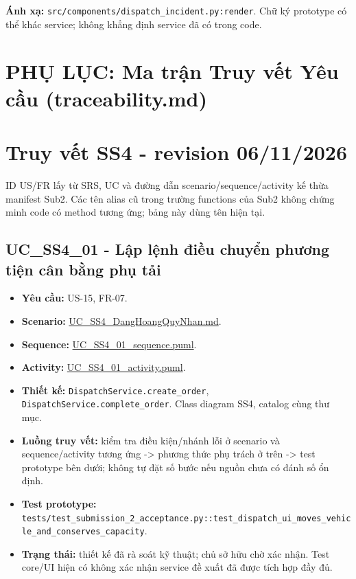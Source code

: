 \documentclass[11pt,a4paper]{article}
\providecommand{\tightlist}{%
  \setlength{\itemsep}{0pt}\setlength{\parskip}{0pt}}
\begin{document}
\textbf{Ánh xạ:} \texttt{src/components/dispatch\_incident.py:render}.
Chữ ký prototype có thể khác service; không khẳng định service đã có
trong code.

\newpage
\section*{PHỤ LỤC: Ma trận Truy vết Yêu cầu (traceability.md)}
\hypertarget{truy-vux1ebft-ss4---revision-06112026}{%
\section{Truy vết SS4 - revision
06/11/2026}\label{truy-vux1ebft-ss4---revision-06112026}}

ID US/FR lấy từ SRS, UC và đường dẫn scenario/sequence/activity kế thừa
manifest Sub2. Các tên alias cũ trong trường functions của Sub2 không
chứng minh code có method tương ứng; bảng này dùng tên hiện tại.

\hypertarget{uc_ss4_01---lux1eadp-lux1ec7nh-ux111iux1ec1u-chuyux1ec3n-phux1b0ux1a1ng-tiux1ec7n-cuxe2n-bux1eb1ng-phux1ee5-tux1ea3i}{%
\subsection{UC\_SS4\_01 - Lập lệnh điều chuyển phương tiện cân bằng phụ
tải}\label{uc_ss4_01---lux1eadp-lux1ec7nh-ux111iux1ec1u-chuyux1ec3n-phux1b0ux1a1ng-tiux1ec7n-cuxe2n-bux1eb1ng-phux1ee5-tux1ea3i}}

\begin{itemize}
\tightlist
\item
  \textbf{Yêu cầu:} US-15, FR-07.
\item
  \textbf{Scenario:}
  \href{../../../../docs/diagrams/Use-case\%20detail-scenario/SS4/Usecase\%20scenario/UC_SS4_DangHoangQuyNhan.md}{UC\_SS4\_DangHoangQuyNhan.md}.
\item
  \textbf{Sequence:}
  \href{../../../../docs/diagrams/Use-case\%20detail-scenario/SS4/Sequence\%20diagrams/UC_SS4_01_sequence.puml}{UC\_SS4\_01\_sequence.puml}.
\item
  \textbf{Activity:}
  \href{../../../../docs/diagrams/Use-case\%20detail-scenario/SS4/Activity\%20diagrams/UC_SS4_01_activity.puml}{UC\_SS4\_01\_activity.puml}.
\item
  \textbf{Thiết kế:} \texttt{DispatchService.create\_order},
  \texttt{DispatchService.complete\_order}. Class diagram SS4, catalog
  cùng thư mục.
\item
  \textbf{Luồng truy vết:} kiểm tra điều kiện/nhánh lỗi ở scenario và
  sequence/activity tương ứng -\textgreater{} phương thức phụ trách ở
  trên -\textgreater{} test prototype bên dưới; không tự đặt số bước nếu
  nguồn chưa có đánh số ổn định.
\item
  \textbf{Test prototype:}
  \texttt{tests/test\_submission\_2\_acceptance.py::test\_dispatch\_ui\_moves\_vehicle\_and\_conserves\_capacity}.
\item
  \textbf{Trạng thái:} thiết kế đã rà soát kỹ thuật; chủ sở hữu chờ xác
  nhận. Test core/UI hiện có không xác nhận service đề xuất đã được tích
  hợp đầy đủ.
\end{itemize}
\end{document}
